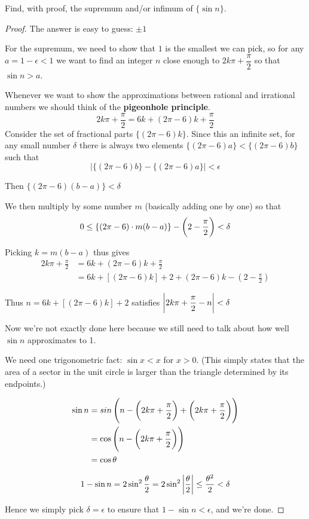\begin{prbm}
Find, with proof, the supremum and/or infimum of $\{\sin n\}$.
\end{prbm}

\begin{proof}
The answer is easy to guess: $\pm1$

For the supremum, we need to show that $1$ is the smallest we can pick, so for any $a=1-\epsilon<1$ we want to find an integer $n$ close enough to $2k\pi+\dfrac{\pi}{2}$ so that $\sin n > a$.

Whenever we want to show the approximations between rational and irrational numbers we should think of the \textbf{pigeonhole principle}.
\[ 2k\pi+\frac{\pi}{2}=6k+(2\pi-6)k+\frac{\pi}{2} \]
Consider the set of fractional parts $\{(2\pi-6)k\}$. Since this an infinite set, for any small number $\delta$ there is always two elements $\{(2\pi-6)a\}<\{(2\pi-6)b\}$ such that
\[ |\{(2\pi-6)b\}-\{(2\pi-6)a\}|<\epsilon \]

Then $\{(2\pi-6)(b-a)\}<\delta$

We then multiply by some number $m$ (basically adding one by one) so that
\[ 0 \le \{(2\pi-6)\cdot m(b-a)\}-\left(2-\frac{\pi}{2}\right)<\delta \]

Picking $k=m(b-a)$ thus gives
\begin{align*}
2k\pi+\frac{\pi}{2} &= 6k+(2\pi-6)k+\frac{\pi}{2} \\
&= 6k+[(2\pi-6)k]+2+{(2\pi-6)k}-(2-\frac{\pi}{2})
\end{align*}

Thus $n=6k+[(2\pi-6)k]+2$ satisfies $\left|2k\pi+\dfrac{\pi}{2}-n\right|<\delta$

Now we're not exactly done here because we still need to talk about how well $\sin n$ approximates to 1.

We need one trigonometric fact: $\sin x<x$ for $x>0$. (This simply states that the area of a sector in the unit circle is larger than the triangle determined by its endpoints.)

\begin{align*}
\sin n &= sin\left(n-\left(2k\pi+\frac{\pi}{2}\right)+\left(2k\pi+\frac{\pi}{2}\right)\right) \\
&= \cos\left(n-\left(2k\pi+\frac{\pi}{2}\right)\right) \\
&= \cos\theta
\end{align*}

\[ 1 - \sin n = 2 \sin^2 \frac{\theta}{2} = 2 \sin^2 \left|\frac{\theta}{2}\right| \le \frac{\theta^2}{2}<\delta \]

Hence we simply pick $\delta=\epsilon$ to ensure that $1 - \sin n<\epsilon$, and we're done.
\end{proof}

